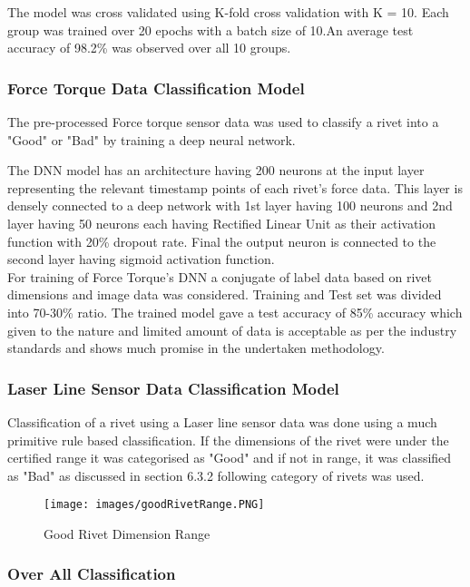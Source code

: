 \documentclass{article}
\begin{document}
The model was cross validated using K-fold cross validation with K = 10. Each group was trained over 20 epochs with a batch size of 10.An average test accuracy of 98.2\% was observed over all 10 groups.

\subsubsection{Force Torque Data Classification Model}

The pre-processed Force torque sensor data was used to classify a rivet into a "Good" or "Bad" by training a deep neural network.

The DNN model has an architecture having 200 neurons at the input layer representing the relevant timestamp points of each rivet's force data. This layer is densely connected to a deep network with 1st layer having 100 neurons and 2nd layer having 50 neurons each having Rectified Linear Unit as their activation function with 20\% dropout rate. Final the output neuron is connected to the second layer having sigmoid activation function.\\

For training of Force Torque's DNN a conjugate of label data based on rivet dimensions and image data was considered. Training and Test set was divided into 70-30\% ratio. The trained model gave a test accuracy of 85\% accuracy which given to the nature and limited amount of data is acceptable as per the industry standards and shows much promise in the undertaken methodology.

\subsubsection{Laser Line Sensor Data Classification Model}

Classification of a rivet using a Laser line sensor data was done using a much primitive rule based classification. If the dimensions of the rivet were under the certified range it was categorised as "Good" and if not in range, it was classified as "Bad" as discussed in section 6.3.2 following category of rivets was used.

\begin{figure}[H]
    \centering
    \texttt{[image: images/goodRivetRange.PNG]}
    \caption{Good Rivet Dimension Range}
    \label{fig:goodRivetRange}
\end{figure}


\subsubsection{Over All Classification}
\end{document}
